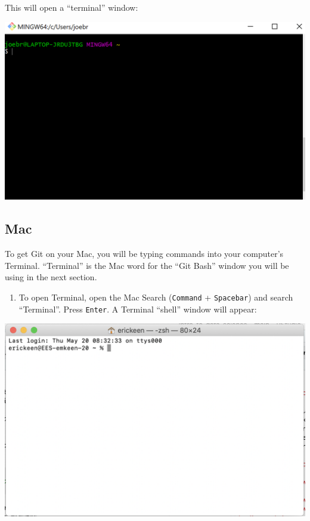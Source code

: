 \documentclass[
]{book}
\providecommand{\tightlist}{%
  \setlength{\itemsep}{0pt}\setlength{\parskip}{0pt}}
\begin{document}
This will open a ``terminal'' window:

\includegraphics{img/git4.png}

\hypertarget{mac}{%
\subsection*{Mac}\label{mac}}

To get Git on your Mac, you will be typing commands into your computer's Terminal. ``Terminal'' is the Mac word for the ``Git Bash'' window you will be using in the next section.

\begin{enumerate}
\def\labelenumi{\arabic{enumi}.}
\tightlist
\item
  To open Terminal, open the Mac Search (\texttt{Command} + \texttt{Spacebar}) and search ``Terminal''. Press \texttt{Enter}. A Terminal ``shell'' window will appear:
\end{enumerate}

\includegraphics{img/bash-mac.png}
\end{document}
